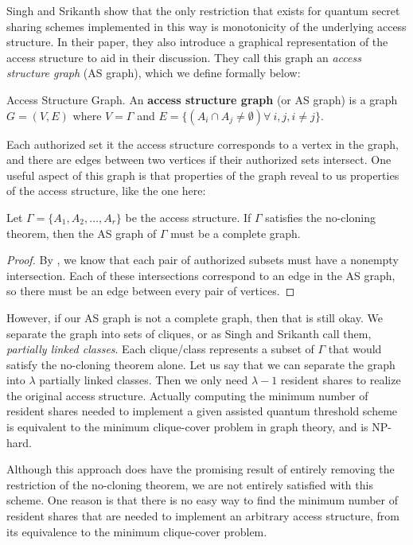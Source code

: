 Singh and Srikanth show that the only restriction that exists for quantum secret sharing schemes implemented in this way is monotonicity of the underlying access structure. In their paper, they also introduce a graphical representation of the access structure to aid in their discussion. They call this graph an \textit{access structure graph} (AS graph), which we define formally below:

\begin{definition}{Access Structure Graph.}
    \label{defn:access-structure-graph}
    An \textbf{access structure graph} (or AS graph) is a graph $G = (V,E)$ where $V = \Gamma$ and $E = \{(A_i \cap A_j \neq \emptyset) \forall\:i,j,i\neq j\}$.
\end{definition}

Each authorized set it the access structure corresponds to a vertex in the graph, and there  are edges between two vertices if their authorized sets intersect. One useful aspect of this graph is that properties of the graph reveal to us properties of the access structure, like the one here:

\begin{proposition}
    \label{prop:complete-as-graph}
    Let $\Gamma = \{A_1,A_2,\dots,A_r\}$ be the access structure. If $\Gamma$ satisfies the no-cloning theorem, then the AS graph of $\Gamma$ must be a complete graph.
\end{proposition}

\begin{proof}
    By , we know that each pair of authorized subsets must have a nonempty intersection. Each of these intersections correspond to an edge in the AS graph, so there must be an edge between every pair of vertices.
\end{proof}

However, if our AS graph is not a complete graph, then that is still okay. We separate the graph into sets of cliques, or as Singh and Srikanth call them, \textit{partially linked classes}. Each clique/class represents a subset of $\Gamma$ that would satisfy the no-cloning theorem alone. Let us say that we can separate the graph into $\lambda$ partially linked classes. Then we only need $\lambda - 1$ resident shares to realize the original access structure. Actually computing the minimum number of resident shares needed to implement a given assisted quantum threshold scheme is equivalent to the minimum clique-cover problem in graph theory, and is NP-hard.

Although this approach does have the promising result of entirely removing the restriction of the no-cloning theorem, we are not entirely satisfied with this scheme. One reason is that there is no easy way to find the minimum number of resident shares that are needed to implement an arbitrary access structure, from its equivalence to the minimum clique-cover problem.

